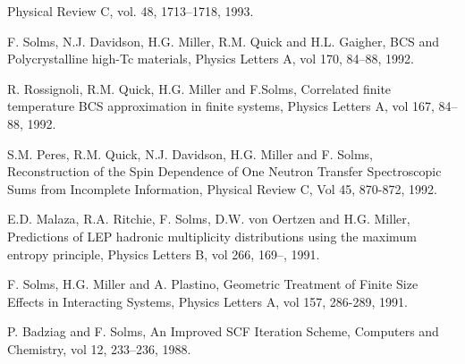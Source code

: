 \documentclass[10pt]{article}
\newenvironment{innerlist}[1][\enskip\textbullet]%
        {\begin{compactitem}[#1]}{\end{compactitem}}
\begin{document}
\begin{innerlist}
	    Physical Review C, vol. 48, 1713--1718, 1993.
      \item F. Solms, N.J. Davidson, H.G. Miller, R.M. Quick and H.L. Gaigher, BCS and Polycrystalline high-Tc materials,
	    Physics Letters A, vol 170, 84--88, 1992.
		\item R. Rossignoli, R.M. Quick, H.G. Miller and F.Solms, Correlated finite temperature BCS approximation in
			 finite systems, Physics Letters A, vol 167, 84--88, 1992.
      \item S.M. Peres, R.M. Quick, N.J. Davidson, H.G. Miller and F. Solms, Reconstruction of the Spin Dependence of 
	    One Neutron Transfer Spectroscopic Sums from Incomplete Information, Physical Review C, Vol 45, 870-872, 1992.
      \item E.D. Malaza, R.A. Ritchie, F. Solms, D.W. von Oertzen and H.G. Miller, Predictions of LEP hadronic
	    multiplicity distributions using the maximum entropy principle, Physics Letters B, vol 266, 169--, 1991.
      \item F. Solms, H.G. Miller and A. Plastino, Geometric Treatment of Finite Size Effects in Interacting Systems, 
	    Physics Letters A, vol 157, 286-289, 1991.
      \item P. Badziag and F. Solms, An Improved SCF Iteration Scheme, Computers and Chemistry, vol 12, 233--236, 1988.
    \end{innerlist}
\end{document}
